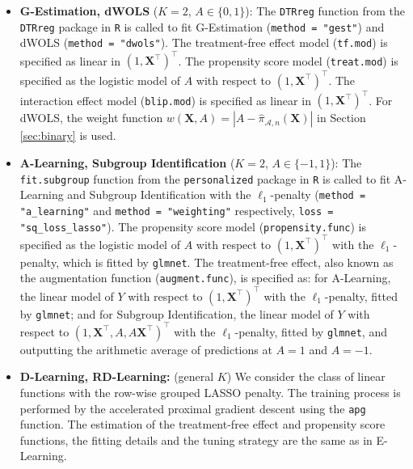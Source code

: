 \documentclass[11pt]{article}
\numberwithin{equation}{section}
\theoremstyle{definition}
\theoremstyle{remark}
\newcommand{\bX}{\bm{X}}
\newcommand{\sA}{\mathscr{A}}
\begin{document}
\begin{itemize}[leftmargin=*]
	\item \textbf{G-Estimation, dWOLS} ($ K=2 $, $ A \in \{0,1\} $): The \texttt{DTRreg} function from the \texttt{DTRreg} package \citep{wallace2017dynamic} in \texttt{R} is called to fit G-Estimation (\texttt{method = "gest"}) and dWOLS (\texttt{method = "dwols"}). The treatment-free effect model (\texttt{tf.mod}) is specified as linear in $ (1,\bX^{\intercal})^{\intercal} $. The propensity score model (\texttt{treat.mod}) is specified as the logistic model of $ A $ with respect to $ (1,\bX^{\intercal}) ^{\intercal} $. The interaction effect model (\texttt{blip.mod}) is specified as linear in $ (1,\bX^{\intercal})^{\intercal} $. For dWOLS, the weight function $ w(\bX,A) = |A - \widehat{\pi}_{\sA,n}(\bX)| $ in Section \ref{sec:binary} is used.
	
	\item \textbf{A-Learning, Subgroup Identification} ($ K = 2 $, $ A \in \{-1,1\} $): The \texttt{fit.subgroup} function from the \texttt{personalized} package \citep{huling2018subgroup} in \texttt{R} is called to fit A-Learning and Subgroup Identification with the $ \ell_{1} $-penalty (\texttt{method = "a\_learning"} and \texttt{method = "weighting"} respectively, \texttt{loss = "sq\_loss\_lasso"}). The propensity score model (\texttt{propensity.func}) is specified as the logistic model of $ A $ with respect to $ (1,\bX^{\intercal})^{\intercal} $ with the $ \ell_{1} $-penalty, which is fitted by \texttt{glmnet}. The treatment-free effect, also known as the augmentation function (\texttt{augment.func}), is specified as: for A-Learning, the linear model of $ Y $ with respect to $ (1,\bX^{\intercal})^{\intercal} $ with the $ \ell_{1} $-penalty, fitted by \texttt{glmnet}; and for Subgroup Identification, the linear model of $ Y $ with respect to $ (1,\bX^{\intercal},A,A\bX^{\intercal})^{\intercal} $ with the $ \ell_{1} $-penalty, fitted by \texttt{glmnet}, and outputting the arithmetic average of  predictions at $ A = 1 $ and $ A = -1 $.
	
	\item \textbf{D-Learning, RD-Learning:} (general $ K $) We consider the class of linear functions with the row-wise grouped LASSO penalty. The training process is performed  by the accelerated proximal gradient descent using the \texttt{apg} function. The estimation of the treatment-free effect and propensity score functions, the fitting details and the tuning strategy are the same as in E-Learning.
	

\end{itemize}
\end{document}
